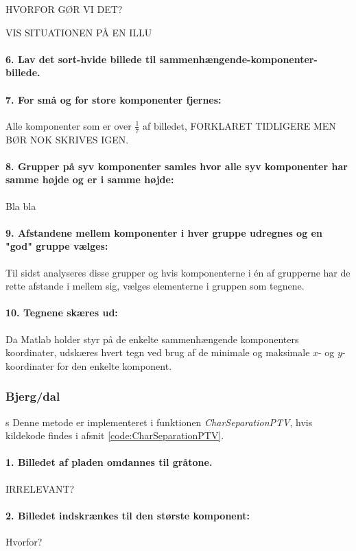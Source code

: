 HVORFOR GØR VI DET?

VIS SITUATIONEN PÅ EN ILLU
\paragraph{6. Lav det sort-hvide billede til sammenhængende-komponenter-billede.}
\paragraph{7. For små og for store komponenter fjernes:} Alle komponenter som er over $\frac{1}{7}$ af billedet, FORKLARET TIDLIGERE MEN BØR NOK SKRIVES IGEN.

\paragraph{8. Grupper på syv komponenter samles hvor alle syv komponenter har samme højde og er i samme højde:} Bla bla

\paragraph{9. Afstandene mellem komponenter i hver gruppe udregnes og en "god" gruppe vælges:}
Til sidst analyseres disse grupper og hvis komponenterne i én af grupperne har de rette afstande i mellem sig, vælges elementerne i gruppen som tegnene.

\paragraph{10. Tegnene skæres ud:} Da Matlab holder styr på de enkelte sammenhængende komponenters koordinater, udskæres hvert tegn ved brug af de minimale og maksimale $x$- og $y$-koordinater for den enkelte komponent.

\subsubsection*{Bjerg/dal}
s
Denne metode er implementeret i funktionen \textit{CharSeparationPTV}, hvis kildekode findes i afsnit \vref{code:CharSeparationPTV}.

\paragraph{1. Billedet af pladen omdannes til gråtone.} IRRELEVANT?

\paragraph{2. Billedet indskrænkes til den største komponent:}
Hvorfor?

